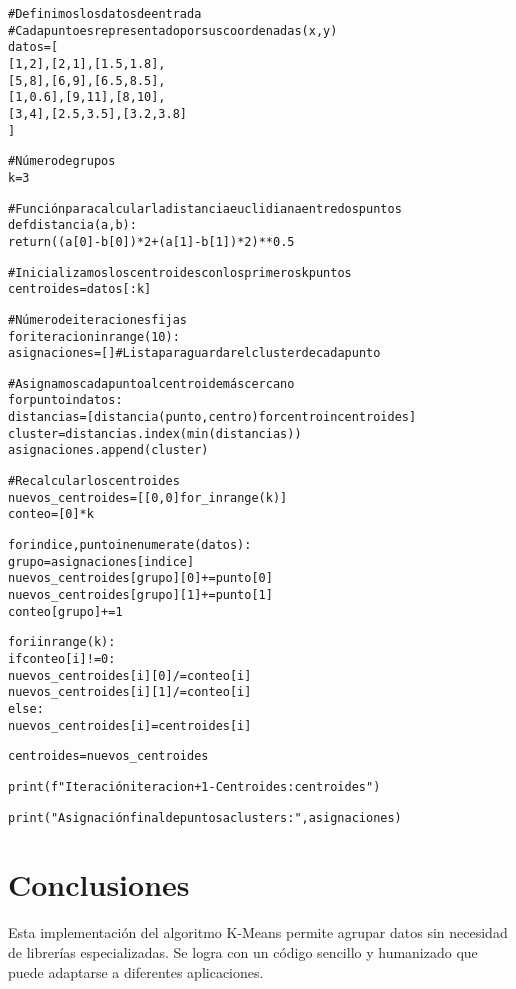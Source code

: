 \documentclass[a4paper, 10pt]{article}
\begin{document}
\begin{alltt}
# Definimos los datos de entrada
# Cada punto es representado por sus coordenadas (x, y)
datos = [
    [1, 2], [2, 1], [1.5, 1.8],
    [5, 8], [6, 9], [6.5, 8.5],
    [1, 0.6], [9, 11], [8, 10],
    [3, 4], [2.5, 3.5], [3.2, 3.8]
]

# Número de grupos
k = 3

# Función para calcular la distancia euclidiana entre dos puntos
def distancia(a, b):
    return ((a[0] - b[0]) * 2 + (a[1] - b[1]) * 2) ** 0.5

# Inicializamos los centroides con los primeros k puntos
centroides = datos[:k]

# Número de iteraciones fijas
for iteracion in range(10):
    asignaciones = []  # Lista para guardar el cluster de cada punto
    
    # Asignamos cada punto al centroide más cercano
    for punto in datos:
        distancias = [distancia(punto, centro) for centro in centroides]
        cluster = distancias.index(min(distancias))
        asignaciones.append(cluster)
    
    # Recalcular los centroides
    nuevos_centroides = [[0, 0] for _ in range(k)]
    conteo = [0] * k
    
    for indice, punto in enumerate(datos):
        grupo = asignaciones[indice]
        nuevos_centroides[grupo][0] += punto[0]
        nuevos_centroides[grupo][1] += punto[1]
        conteo[grupo] += 1
    
    for i in range(k):
        if conteo[i] != 0:
            nuevos_centroides[i][0] /= conteo[i]
            nuevos_centroides[i][1] /= conteo[i]
        else:
            nuevos_centroides[i] = centroides[i]
    
    centroides = nuevos_centroides

    print(f"Iteración {iteracion + 1} - Centroides: {centroides}")

print("Asignación final de puntos a clusters:", asignaciones)
\end{alltt}

\section{Conclusiones}
Esta implementaci\'on del algoritmo K-Means permite agrupar datos sin necesidad de librer\'ias especializadas. Se logra con un c\'odigo sencillo y humanizado que puede adaptarse a diferentes aplicaciones.
\end{document}
